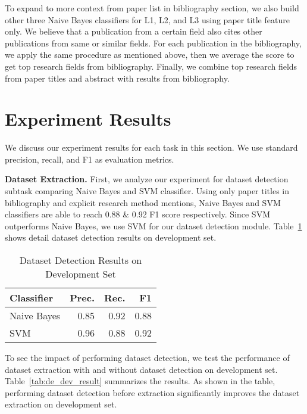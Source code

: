 To expand to more context from paper list in bibliography section, we also build other three Naive Bayes classifiers for L1, L2, and L3 using paper title feature only. We believe that a publication from a certain field also cites other publications from same or similar fields. For each publication in the bibliography, we apply the same procedure as mentioned above, then we average the score to get top research fields from bibliography. Finally, we combine top research fields from paper titles and abstract with results from bibliography.


\section{Experiment Results}
\label{sec:experiments}

We discuss our experiment results for each task in this section. We use standard precision, recall, and F1 as evaluation metrics.

\textbf{Dataset Extraction.} First, we analyze our experiment for dataset detection subtask comparing Naive Bayes and SVM classifier. Using only paper titles in bibliography and explicit research method mentions, Naive Bayes and SVM classifiers are able to reach 0.88 \& 0.92 F1 score respectively. Since SVM outperforms Naive Bayes, we use SVM for our dataset detection module. Table~\ref{tab:dd_dev_result} shows detail dataset detection results on development set.

\begin{table}[t!]
\begin{center}
\begin{tabular}{|l|r|r|r|}
\hline \bf Classifier  & \bf Prec. & \bf Rec. & \bf F1 \\ \hline
Naive Bayes & 0.85 & 0.92 & 0.88 \\
SVM & 0.96 & 0.88 & 0.92 \\
\hline
\end{tabular}
\end{center}
\caption{\label{tab:dd_dev_result} Dataset Detection Results on Development Set}
\end{table}

To see the impact of performing dataset detection, we test the performance of dataset extraction with and without dataset detection on development set. Table~\ref{tab:de_dev_result} summarizes the results. As shown in the table, performing dataset detection before extraction significantly improves the dataset extraction on development set.

